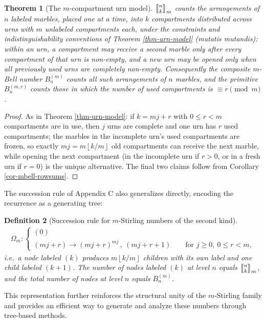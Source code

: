 \documentclass[a4paper]{amsart}
\numberwithin{equation}{section}
\newcommand{\mStirling}[0]{\genfrac{\llbracket}{\rrbracket}{0pt}{}}
\newcommand{\floor}[1]{\left\lfloor #1 \right\rfloor}
\newtheorem{theorem}{Theorem}[section]
\newtheorem{definition}[theorem]{Definition}
\begin{document}
\begin{theorem}[The $m$-compartment urn model]\label{thm-general-urn}
$\mStirling{n}{k}_m$ counts the arrangements of $n$ labeled marbles, placed one at a time, into $k$ compartments distributed across urns with $m$ unlabeled compartments each, under the constraints and indistinguishability conventions of Theorem \ref{thm-urn-model} (mutatis mutandis): within an urn, a compartment may receive a second marble only after every compartment of that urn is non-empty, and a new urn may be opened only when all previously used urns are completely non-empty. Consequently the composite $m$-Bell number $B^{(m)}_n$ counts all such arrangements of $n$ marbles, and the primitive $B^{(m,r)}_n$ counts those in which the number of used compartments is $\equiv r \pmod m$.
\end{theorem}
\begin{proof}
As in Theorem \ref{thm-urn-model}: if $k = mj + r$ with $0 \le r < m$ compartments are in use, then $j$ urns are complete and one urn has $r$ used compartments; the marbles in the incomplete urn's used compartments are frozen, so exactly $mj = m\floor{k/m}$ old compartments can receive the next marble, while opening the next compartment (in the incomplete urn if $r > 0$, or in a fresh urn if $r = 0$) is the unique alternative. The final two claims follow from Corollary \ref{cor-mbell-rowsums}.
\end{proof}

The succession rule of Appendix C also generalizes directly, encoding the recurrence as a generating tree:
\begin{definition}[Succession rule for $m$-Stirling numbers of the second kind]\label{def-succession-general}
\begin{align*}
\Omega_m: \begin{cases}
(0) \\
(mj+r) \to (mj+r)^{mj}\,,\ (mj+r+1) \qquad \text{for } j \geq 0,\ 0 \leq r < m,
\end{cases}
\end{align*}
i.e.\ a node labeled $(k)$ produces $m\floor{k/m}$ children with its own label and one child labeled $(k+1)$. The number of nodes labeled $(k)$ at level $n$ equals $\mStirling{n}{k}_m$, and the total number of nodes at level $n$ equals $B^{(m)}_n$.
\end{definition}
This representation further reinforces the structural unity of the $m$-Stirling family and provides an efficient way to generate and analyze these numbers through tree-based methods.
\end{document}
